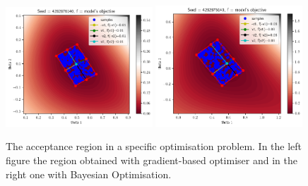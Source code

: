 \begin{figure}[ht]
    \begin{center}
        \includegraphics[width=0.49\textwidth]{./latex_files/images/chapter4/ma2_region_1.png}
        \includegraphics[width=0.49\textwidth]{./latex_files/images/chapter4/ma2_region_1_bo.png}
    \end{center}
  \caption[The acceptance region of a specific deterministic simulator.]{The acceptance region in a specific optimisation problem. In the left figure the region obtained with gradient-based optimiser and in the right one with Bayesian Optimisation.}
  \label{fig:ma2_5}
\end{figure}


